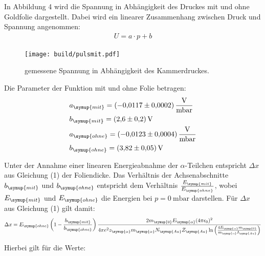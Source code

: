 In Abbildung 4 wird  die Spannung in Abhängigkeit des Druckes mit und ohne Goldfolie dargestellt. Dabei wird ein linearer
Zusammenhang zwischen Druck und Spannung angenommen:
\begin{align*}
  U = a \cdot p + b
\end{align*}

\begin{figure}[H]
  \centering
  \texttt{[image: build/pulsmit.pdf]}
  \caption{gemessene Spannung in Abhängigkeit des Kammerdruckes.}
  \label{fig:ohne}
\end{figure}

Die Parameter der Funktion mit und ohne Folie betragen:
\begin{align*}
  &a_{\symup{mit}} = \SI{-0.0117(2)}{\volt\per\milli\bar}  \\
  &b_{\symup{mit}} = \SI{2.6(2)}{\volt}  \\
  &a_{\symup{ohne}}= \SI{-0.0123(4)}{\volt\per\milli\bar}  \\
  &b_{\symup{ohne}} = \SI{ 3.82(5)}{\volt} \\
\end{align*}

Unter der Annahme einer linearen Energieabnahme der $\alpha$-Teilchen entspricht $\Delta x$ aus Gleichung (1) der Foliendicke.
Das Verhältnis der Achsenabschnitte $b_{\symup{mit}}$ und $b_{\symup{ohne}}$ entspricht dem Verhältnis $\frac{E_{\symup{mit}}}{E_{\symup{ohne}}}$, wobei
$E_{\symup{mit}}$ und $E_{\symup{ohne}}$ die Energien bei $p=\SI{0}{\milli\bar}$ darstellen.
Für $\Delta x$ aus Gleichung (1) gilt damit:
\begin{align}
  \Delta x = E_{\symup{ohne}} \left(1- \frac{b_{\symup{mit}}}{b_{\symup{ohne}}}\right) \frac{2 m_{\symup{0}} E_{\symup{\alpha}} (4 \pi \epsilon_0)^2}{4 \pi e^2 z_{\symup{\alpha}}  m_{\symup{\alpha}} N_{\symup{Au}} Z_{\symup{Au}} \ln{\left(\frac{4 E_{\symup{\alpha}} m_{\symup{0}}}{m_{\symup{\alpha}} I_{\symup{Au}}}\right)}}
\end{align}

Hierbei gilt für die Werte:

